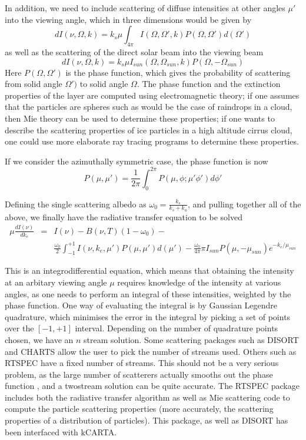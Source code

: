 \documentclass[11pt]{article}
\begin{document}
In addition, we need to include scattering of diffuse intensities at 
other angles $\mu\prime$ into the viewing angle, which in three dimensions 
would be given by \cite{lio:80,goo:89}
\[
dI(\nu,\Omega,k) = k_{s} \mu \int_{4\pi} I(\Omega,\Omega\prime,k) 
P(\Omega,\Omega\prime) d(\Omega\prime)
\]
as well as the scattering of the direct solar beam into the viewing beam
\cite{lio:80,goo:89}
\[
dI(\nu,\Omega,k) = k_{s} \mu I_{sun}(\Omega,\Omega_{sun},k) 
P(\Omega,-\Omega_{sun}) 
\]
Here $P(\Omega,\Omega\prime)$ is the phase function, which gives the 
probability of scattering from solid angle $\Omega\prime)$ to solid angle
$\Omega$. The phase function and the extinction properties of the layer are
computed using electromagnetic theory; if one assumes that the particles are
spheres such as would be the case of raindrops in a cloud, then Mie theory 
\cite{van:82,lio:80,boh:98} can be used to determine these properties; if
one wants to describe the scattering properties of ice particles in a high
altitude cirrus cloud, one could use more elaborate ray tracing programs to 
determine these properties. 

If we consider  the azimuthally symmetric case, the phase function is now 
\cite{lio:80}
\[
P(\mu,\mu\prime) =  \frac{1}{2\pi} \int_{0}^{2\pi} 
P(\mu,\phi;\mu\prime \phi\prime) d\phi\prime
\]

Defining the single scattering albedo as
 $\omega_{0} = \frac{k_{s}}{k_{s}+k_{a}}$, and pulling together all of
the above, we finally have the radiative transfer equation to be solved 
\cite{lio:80,goo:89}
\[
\begin{array}{ccc}
\mu \frac{dI(\nu)}{dk_{e}} & = & I(\nu) - B(\nu,T)(1-\omega_{0}) - \\
& & 
\frac{\omega_{0}}{2}\int_{-1}^{+1} I(\nu,k_{e},\mu\prime) P(\mu,\mu\prime)
d(\mu\prime) - 
\frac{\omega_{0}}{4\pi} \pi I_{sun} P(\mu,-\mu_{sun}) e^{-k_{e}/\mu_{sun}} 
\end{array}
\]

This is an integrodifferential equation, which means that obtaining
the intensity at an arbitary viewing angle $\mu$ requires knowledge of the 
intensity at various angles, as one needs to perform an integral of these
intensities, weighted by the phase function. One way of evaluating the 
integral is by
Gaussian Legendre quadrature, which minimises the error in the integral by
picking a set of points over the $[-1,+1]$ interval. Depending on the number
of quadrature points chosen, we have an $n$ stream solution. Some scattering
packages such as \textsf{DISORT} and \textsf{CHARTS} allow the user to pick
the number of streams used. Others such as \textsf{RTSPEC} have a fixed 
number of streams. This should not be a very serious problem, as the large 
number of scatterers actually smooths out the phase function \cite{dee:98}, 
and a twostream solution can be quite accurate. The \textsf{RTSPEC} package
includes both the radiative transfer algorithm as well as Mie scattering code
to compute the particle scattering properties (more accurately, the scattering
properties of a distribution of particles). This package, as well as 
\textsf{DISORT} has been interfaced with \textsf{kCARTA}. 
\end{document}
